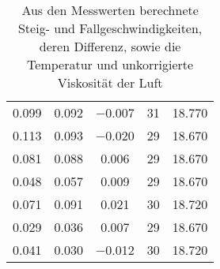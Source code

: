 \begin{table}[!h]
\begin{adjustbox}{width=\textwidth, center}
\begin{tabular}{|c|c|c|c|c|}
		\num{0.099} & \num{0.092} & \num{-0.007} & \num{31} & \num{18.770}\\
		\num{0.113} & \num{0.093} & \num{-0.020} & \num{29} & \num{18.670}\\
		\num{0.081} & \num{0.088} & \num{0.006} & \num{29} & \num{18.670}\\
		\num{0.048} & \num{0.057} & \num{0.009} & \num{29} & \num{18.670}\\
		\num{0.071} & \num{0.091} & \num{0.021} & \num{30} & \num{18.720}\\
		\num{0.029} & \num{0.036} & \num{0.007} & \num{29} & \num{18.670}\\
		\num{0.041} & \num{0.030} & \num{-0.012} & \num{30} & \num{18.720}\\
		\hline
	\end{tabular}
	\end{adjustbox}
	\caption{Aus den Messwerten berechnete Steig- und Fallgeschwindigkeiten, deren Differenz, 
	sowie die Temperatur und unkorrigierte Viskosität der Luft \label{tab:Auswertung_Ergebnisse}}
\end{table}
